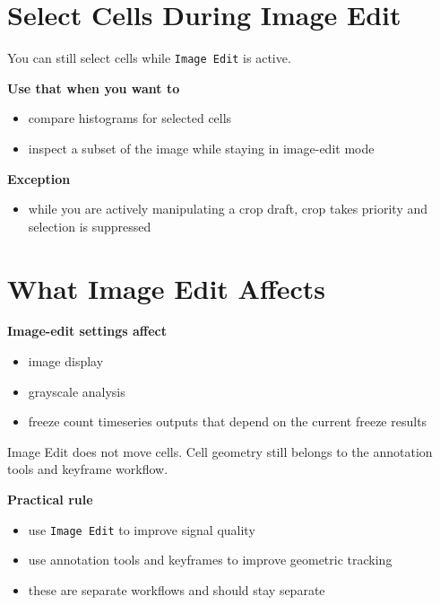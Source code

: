 \documentclass[
  9pt,
  letterpaper,
  oneside,
  open=any,
  DIV=15,
  parskip=half-,
  headings=big,
  numbers=noenddot
]{scrbook}
\newcommand{\manuallead}[1]{%
  \vspace{0.15em}%
  {\sffamily\bfseries\color{ManualBlue}#1}\par\nobreak\vspace{0.05em}%
}
\begin{document}
\section{Select Cells During Image Edit}

You can still select cells while \texttt{Image Edit} is active.


\manuallead{Use that when you want to}

\begin{itemize}[leftmargin=*,itemsep=0.35em,topsep=0.4em]
\item compare histograms for selected cells
\item inspect a subset of the image while staying in image-edit mode
\end{itemize}

\manuallead{Exception}

\begin{itemize}[leftmargin=*,itemsep=0.35em,topsep=0.4em]
\item while you are actively manipulating a crop draft, crop takes priority and selection is suppressed
\end{itemize}

\section{What Image Edit Affects}

\manuallead{Image-edit settings affect}

\begin{itemize}[leftmargin=*,itemsep=0.35em,topsep=0.4em]
\item image display
\item grayscale analysis
\item freeze count timeseries outputs that depend on the current freeze results
\end{itemize}

Image Edit does not move cells. Cell geometry still belongs to the annotation tools and keyframe workflow.


\manuallead{Practical rule}

\begin{itemize}[leftmargin=*,itemsep=0.35em,topsep=0.4em]
\item use \texttt{Image Edit} to improve signal quality
\item use annotation tools and keyframes to improve geometric tracking
\item these are separate workflows and should stay separate
\end{itemize}
\end{document}
